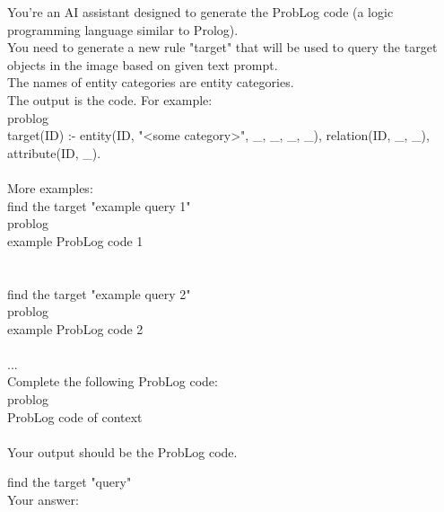 \begin{prompt}[title={Prompt \thetcbcounter: Logic Query Generator LLM}] \label{prompt:logic_query}
You're an AI assistant designed to generate the ProbLog code (a logic programming language similar to Prolog). \\

You need to generate a new rule "target" that will be used to query the target objects in the image based on given text prompt. \\

The names of entity categories are \textlangle entity categories\textrangle. \\

The output is the code. For example: \\
\textasciigrave\textasciigrave\textasciigrave problog \\
target(ID) :- entity(ID, "<some category>", \_, \_, \_, \_), relation(ID, \_, \_), attribute(ID, \_). \\
\textasciigrave\textasciigrave\textasciigrave \\

More examples: \\
find the target "\textlangle example query 1\textrangle"\\
\textasciigrave\textasciigrave\textasciigrave problog\\
\textlangle example ProbLog code 1\textrangle\\
\textasciigrave\textasciigrave\textasciigrave\\
\\
find the target "\textlangle example query 2\textrangle"\\
\textasciigrave\textasciigrave\textasciigrave problog\\
\textlangle example ProbLog code 2\textrangle\\
\textasciigrave\textasciigrave\textasciigrave\\
...\\

Complete the following ProbLog code:\\
\textasciigrave\textasciigrave\textasciigrave problog\\
\textlangle ProbLog code of context\textrangle\\
\textasciigrave\textasciigrave\textasciigrave \\

Your output should be the ProbLog code.

find the target "\textlangle query\textrangle"\\
Your answer: 
\end{prompt}


